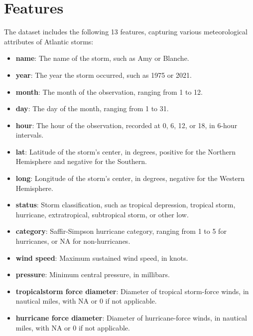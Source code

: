 \section{Features}
The dataset includes the following 13 features, capturing various meteorological attributes of Atlantic storms:
\begin{itemize}
	\item \textbf{name}: The name of the storm, such as Amy or Blanche.
	\item \textbf{year}: The year the storm occurred, such as 1975 or 2021.
	\item \textbf{month}: The month of the observation, ranging from 1 to 12.
	\item \textbf{day}: The day of the month, ranging from 1 to 31.
	\item \textbf{hour}: The hour of the observation, recorded at 0, 6, 12, or 18, in 6-hour intervals.
	\item \textbf{lat}: Latitude of the storm’s center, in degrees, positive for the Northern Hemisphere and negative for the Southern.
	\item \textbf{long}: Longitude of the storm’s center, in degrees, negative for the Western Hemisphere.
	\item \textbf{status}: Storm classification, such as tropical depression, tropical storm, hurricane, extratropical, subtropical storm, or other low.
	\item \textbf{category}: Saffir-Simpson hurricane category, ranging from 1 to 5 for hurricanes, or NA for non-hurricanes.
	\item \textbf{wind speed}: Maximum sustained wind speed, in knots.
	\item \textbf{pressure}: Minimum central pressure, in millibars.
	\item \textbf{tropicalstorm force diameter}: Diameter of tropical storm-force winds, in nautical miles, with NA or 0 if not applicable.
	\item \textbf{hurricane force diameter}: Diameter of hurricane-force winds, in nautical miles, with NA or 0 if not applicable.
\end{itemize}


